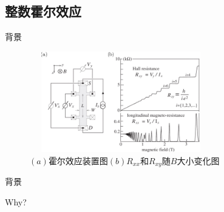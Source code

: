 \documentclass{beamer}
\begin{document}
\subsection{整数霍尔效应}
\begin{frame}{背景}
	\begin{figure}[H]
		\begin{center}
			\includegraphics[width=8cm,height=4.4cm]{pic/2.png}
			\caption{$(a)$霍尔效应装置图$(b)R_{xx}$和$R_{xy}$随$B$大小变化图\cite{Abouzaid2018TheIQ}}
		\end{center}
	\end{figure}
\end{frame}
\begin{frame}{背景}
	\begin{center}
		{\Huge\calligra Why?}
	\end{center}
\end{frame}
\end{document}

